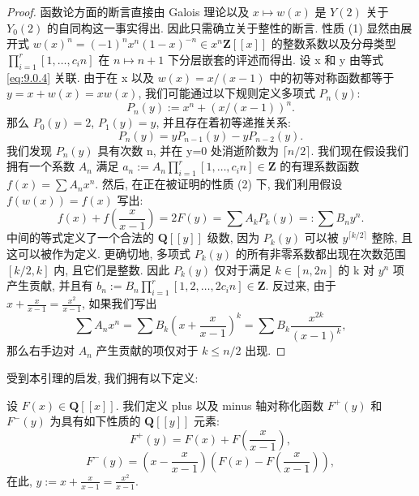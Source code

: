\begin{proof}
函数论方面的断言直接由 Galois 理论以及 \(x \mapsto w(x)\) 
是 \(Y(2)\) 关于 \(Y_0(2)\) 的自同构这一事实得出. 
因此只需确立关于整性的断言. 
性质 (1) 显然由展开式 \(w(x)^n = (-1)^n x^n (1-x)^{-n} \in x^n \mathbf{Z}[\![x]\!]\) 
的整数系数以及分母类型 \(\prod_{i=1}^r [1,\ldots,c_i n]\) 在 \(n\mapsto n+1\) 下分层嵌套的评述而得出. 
设 x 和 y 由等式 \eqref{eq:9.0.4} 关联. 
由于在 x 以及 \(w(x) = x/(x-1)\) 中的初等对称函数都等于 \(y = x + w(x) = xw(x)\), 
我们可能通过以下规则定义多项式 \(P_n(y)\):
\begin{equation}\label{eq:9.0.7}
P_n(y) := x^n + (x/(x-1))^n.
\end{equation}
那么 \(P_0(y) = 2\), \(P_1(y) = y\), 并且存在着初等递推关系:
\[ P_n(y) = yP_{n-1}(y) - yP_{n-2}(y). \]
我们发现 \(P_n(y)\) 具有次数 n, 并在 y=0 处消逝阶数为 \(\lceil n/2 \rceil\). 
我们现在假设我们拥有一个系数 \(A_n\) 满足 \(a_n := A_n \prod_{i=1}^r [1, \ldots, c_i n] \in \mathbf{Z}\) 的有理系数函数 \(f(x) = \sum A_n x^n\). 
然后, 在正在被证明的性质 (2) 下, 我们利用假设 \(f(w(x)) = f(x)\) 写出:
\[ f(x) + f\left(\frac{x}{x-1}\right) = 2F(y) = \sum A_k P_k(y) =: \sum B_n y^n. \]
中间的等式定义了一个合法的 \(\mathbf{Q}[\![y]\!]\) 级数, 
因为 \(P_k(y)\) 可以被 \(y^{\lceil k/2 \rceil}\) 整除, 且这可以被作为定义. 
更确切地, 多项式 \(P_k(y)\) 的所有非零系数都出现在次数范围 \([k/2, k]\) 内, 
且它们是整数. 
因此 \(P_k(y)\) 仅对于满足 \(k \in [n, 2n]\) 的 k 对 \(y^n\) 项产生贡献, 
并且有 \(b_n := B_n \prod_{i=1}^r [1, 2, \dots, 2c_i n] \in \mathbf{Z}\). 
反过来, 由于 \(x + \frac{x}{x-1} = \frac{x^2}{x-1}\), 如果我们写出
\[ \sum A_n x^n = \sum B_k \left( x + \frac{x}{x-1} \right)^k = \sum B_k \frac{x^{2k}}{(x-1)^k}, \]
那么右手边对 \(A_n\) 产生贡献的项仅对于 \(k \leq n/2\) 出现.
\end{proof}

受到本引理的启发, 我们拥有以下定义:

\begin{definition}\label{def:9.0.8}
设 \(F(x) \in \mathbf{Q}[\![x]\!]\). 
我们定义 plus 以及 minus 轴对称化函数 \(F^+(y)\) 和 \(F^-(y)\) 为具有如下性质的 \(\mathbf{Q}[\![y]\!]\) 元素:
\begin{equation}\label{eq:9.0.9}
F^{+}(y) = F(x) + F\left(\frac{x}{x-1}\right),
\end{equation}
\[ F^{-}(y) = \left(x - \frac{x}{x-1}\right) \left(F(x) - F\left(\frac{x}{x-1}\right)\right), \]
在此, \(y := x + \frac{x}{x-1} = \frac{x^2}{x-1}\).
\end{definition}

